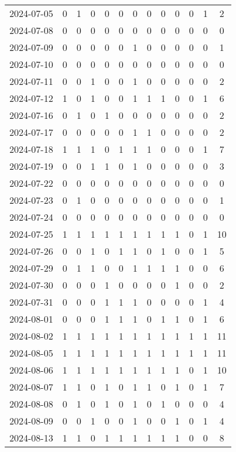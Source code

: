 \documentclass[dvipdfmx,oneside]{article}
\begin{document}
\begin{longtable}{lcccccccccccc}
2024-07-05 & 0 & 1 & 0 & 0 & 0 & 0 & 0 & 0 & 0 & 0 & 1 & 2 \\
2024-07-08 & 0 & 0 & 0 & 0 & 0 & 0 & 0 & 0 & 0 & 0 & 0 & 0 \\
2024-07-09 & 0 & 0 & 0 & 0 & 0 & 1 & 0 & 0 & 0 & 0 & 0 & 1 \\
2024-07-10 & 0 & 0 & 0 & 0 & 0 & 0 & 0 & 0 & 0 & 0 & 0 & 0 \\
2024-07-11 & 0 & 0 & 1 & 0 & 0 & 1 & 0 & 0 & 0 & 0 & 0 & 2 \\
2024-07-12 & 1 & 0 & 1 & 0 & 0 & 1 & 1 & 1 & 0 & 0 & 1 & 6 \\
2024-07-16 & 0 & 1 & 0 & 1 & 0 & 0 & 0 & 0 & 0 & 0 & 0 & 2 \\
2024-07-17 & 0 & 0 & 0 & 0 & 0 & 1 & 1 & 0 & 0 & 0 & 0 & 2 \\
2024-07-18 & 1 & 1 & 1 & 0 & 1 & 1 & 1 & 0 & 0 & 0 & 1 & 7 \\
2024-07-19 & 0 & 0 & 1 & 1 & 0 & 1 & 0 & 0 & 0 & 0 & 0 & 3 \\
2024-07-22 & 0 & 0 & 0 & 0 & 0 & 0 & 0 & 0 & 0 & 0 & 0 & 0 \\
2024-07-23 & 0 & 1 & 0 & 0 & 0 & 0 & 0 & 0 & 0 & 0 & 0 & 1 \\
2024-07-24 & 0 & 0 & 0 & 0 & 0 & 0 & 0 & 0 & 0 & 0 & 0 & 0 \\
2024-07-25 & 1 & 1 & 1 & 1 & 1 & 1 & 1 & 1 & 1 & 0 & 1 & 10 \\
2024-07-26 & 0 & 0 & 1 & 0 & 1 & 1 & 0 & 1 & 0 & 0 & 1 & 5 \\
2024-07-29 & 0 & 1 & 1 & 0 & 0 & 1 & 1 & 1 & 1 & 0 & 0 & 6 \\
2024-07-30 & 0 & 0 & 0 & 1 & 0 & 0 & 0 & 0 & 1 & 0 & 0 & 2 \\
2024-07-31 & 0 & 0 & 0 & 1 & 1 & 1 & 0 & 0 & 0 & 0 & 1 & 4 \\
2024-08-01 & 0 & 0 & 0 & 1 & 1 & 1 & 0 & 1 & 1 & 0 & 1 & 6 \\
2024-08-02 & 1 & 1 & 1 & 1 & 1 & 1 & 1 & 1 & 1 & 1 & 1 & 11 \\
2024-08-05 & 1 & 1 & 1 & 1 & 1 & 1 & 1 & 1 & 1 & 1 & 1 & 11 \\
2024-08-06 & 1 & 1 & 1 & 1 & 1 & 1 & 1 & 1 & 1 & 0 & 1 & 10 \\
2024-08-07 & 1 & 1 & 0 & 1 & 0 & 1 & 1 & 0 & 1 & 0 & 1 & 7 \\
2024-08-08 & 0 & 1 & 0 & 1 & 0 & 1 & 0 & 1 & 0 & 0 & 0 & 4 \\
2024-08-09 & 0 & 0 & 1 & 0 & 0 & 1 & 0 & 0 & 1 & 0 & 1 & 4 \\
2024-08-13 & 1 & 1 & 0 & 1 & 1 & 1 & 1 & 1 & 1 & 0 & 0 & 8 \\

\end{longtable}
\end{document}
